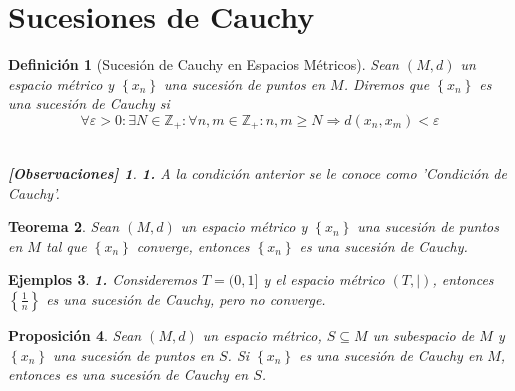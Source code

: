 \documentclass[oneside]{book} %
\theoremstyle{Teorema}
\newtheorem{Definicion}{Definición}[chapter]
\newtheorem{Teorema}[Definicion]{Teorema}
\newtheorem{Proposicion}[Definicion]{Proposición}
\theoremstyle{Ejemplos}
\newtheorem{Ejemplos}[Definicion]{Ejemplos}
\theoremstyle{[Obs]}
\newtheorem*{Obs}{[Observaciones]}
\newcommand{\absSymbol}{\left|\right.} %
\renewcommand{\{}{\left\lbrace} %
\renewcommand{\}}{\right\rbrace} %
\renewcommand{\sc}{\subseteq} %
\begin{document}
		\section{Sucesiones de Cauchy}

			\begin{Definicion}[Sucesión de Cauchy en Espacios Métricos]
				
				Sean $(M, d)$ un espacio métrico y $\{ x_n \}$ una sucesión de puntos en $M$. Diremos que $\{ x_n \}$ es una sucesión de Cauchy si \\

				\[ \forall \varepsilon > 0 : \exists N \in \mathbb{Z}_{+} : \forall n, m \in \mathbb{Z}_{+} : n, m \geq N \Rightarrow d(x_n, x_m) < \varepsilon \] \\

				\begin{Obs}
				
					\hfill
				
					\textbf{1.} A la condición anterior se le conoce como 'Condición de Cauchy'. \\
				
				\end{Obs}

			\end{Definicion}

			\begin{Teorema}
				
				Sean $(M, d)$ un espacio métrico y $\{ x_n \}$ una sucesión de puntos en $M$ tal que $\{ x_n \}$ converge, entonces $\{ x_n \}$ es una sucesión de Cauchy. \\

			\end{Teorema}

			\begin{Ejemplos}
				
				\hfill

				\textbf{1.} Consideremos $T = (0, 1]$ y el espacio métrico $(T, \absSymbol)$, entonces $\{ \frac{1}{n} \}$ es una sucesión de Cauchy, pero no converge. \\

			\end{Ejemplos}

			\begin{Proposicion}
				
				Sean $(M, d)$ un espacio métrico, $S \sc M$ un subespacio de $M$ y $\{ x_n \}$ una sucesión de puntos en $S$. Si $\{ x_n \}$ es una sucesión de Cauchy en $M$, entonces es una sucesión de Cauchy en $S$. \\

			\end{Proposicion}
\end{document}
